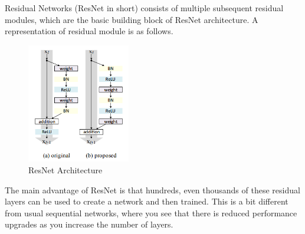 Residual Networks (ResNet in short) consists of multiple subsequent residual modules, which are the basic building block of ResNet architecture. A representation of residual module is as follows.


\begin{figure}[H]
\centering
\includegraphics[width=0.4\textwidth]{./figures/ResNet}
\caption{ResNet Architecture}
\end{figure}

The main advantage of ResNet is that hundreds, even thousands of these residual layers can be used to create a network and then trained. This is a bit different from usual sequential networks, where you see that there is reduced performance upgrades as you increase the number of layers.


